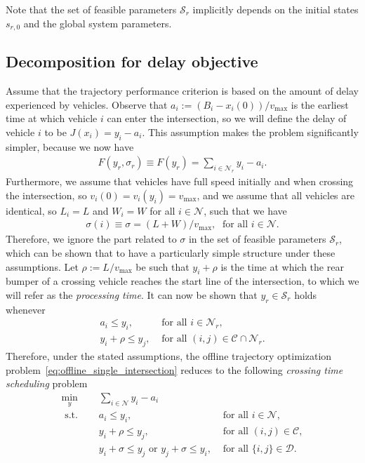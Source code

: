 \documentclass[a4paper]{article}
\theoremstyle{definition}
\theoremstyle{plain}
\begin{document}
Note that the set of feasible parameters $\mathcal{S}_{r}$ implicitly depends on
the initial states ${s}_{r,0}$ and the global system parameters.


\subsection{Decomposition for delay objective}

Assume that the trajectory performance criterion is based on the amount of delay experienced by vehicles.
Observe that $a_{i} := (B_{i} - x_{i}(0)) / v_{\max}$ is the earliest time at
which vehicle $i$ can enter the intersection, so we will define the delay of
vehicle $i$ to be $J(x_{i}) = y_i - a_{i}$. This assumption makes the problem
significantly simpler, because we now have
\begin{align*}
  F(y_{r}, \sigma_{r}) \equiv F(y_{r}) = \sum_{i \in \mathcal{N}_{r}} y_i - a_{i}.
\end{align*}
%
Furthermore, we assume that vehicles have full speed initially and when crossing
the intersection, so $v_{i}(0) = v_{i}(y_i) = v_{\max}$, and we assume that all
vehicles are identical, so $L_{i} = L$ and $W_{i} = W$ for all
$i \in \mathcal{N}$, such that we have
\begin{align*}
\sigma(i) \equiv \sigma = (L + W) / v_{\max}, \; \text{ for all } i \in \mathcal{N} .
\end{align*}
%
Therefore, we ignore the part related to $\sigma$ in the set of feasible parameters
$\mathcal{S}_{r}$, which can be shown that to have a particularly simple
structure under these assumptions.
Let $\rho := L / v_{\max}$ be such that $y_i + \rho$ is the time at which the rear
bumper of a crossing vehicle reaches the start line of the intersection, to
which we will refer as the \textit{processing time}. It can now be shown that
$y_{r} \in \mathcal{S}_{r}$ holds whenever
\begin{align*}
  a_{i} \leq y_i , & \text{ for all } i \in \mathcal{N}_{r} , \\
  y_i + \rho \leq y_j , & \text{ for all } (i,j) \in \mathcal{C} \cap \mathcal{N}_{r} .
\end{align*}
Therefore, under the stated assumptions, the offline trajectory optimization
problem~\eqref{eq:offline_single_intersection} reduces to the following \textit{crossing time scheduling} problem
\begin{subequations}
  \label{eq:crossing_time_scheduling}
\begin{align}
  \min_{y} \quad & \sum_{i \in \mathcal{N}} y_i - a_{i} \\
  \text{ s.t. } \quad & a_{i} \leq y_i , & \text{ for all } i \in \mathcal{N} , \\
                    & y_i + \rho \leq y_{j} , & \text{ for all } (i,j) \in \mathcal{C} \label{eq:conjunctive} , \\
                    & y_i + \sigma \leq y_{j} \text{ or } y_j + \sigma \leq y_i , & \text{ for all } \{i,j\} \in \mathcal{D} \label{eq:disjunctive} .
\end{align}
\end{subequations}
\end{document}
